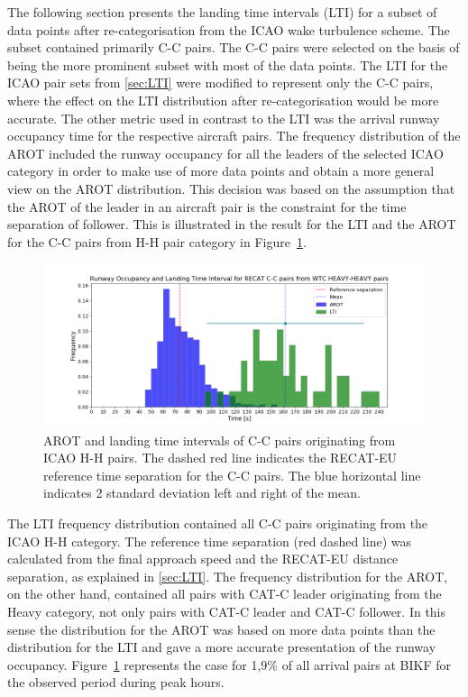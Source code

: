 The following section presents the landing time intervals (LTI) for a subset of data points after re-categorisation from the ICAO wake turbulence scheme. The subset contained primarily C-C pairs. The C-C pairs were selected on the basis of being the more prominent subset with most of the data points. The LTI for the ICAO pair sets from \ref{sec:LTI} were modified to represent only the C-C pairs, where the effect on the LTI distribution after re-categorisation would be more accurate. The other metric used in contrast to the LTI was the arrival runway occupancy time for the respective aircraft pairs. The frequency distribution of the AROT included the runway occupancy for all the leaders of the selected ICAO category in order to make use of more data points and obtain a more general view on the AROT distribution. This decision was based on the assumption that the AROT of the leader in an aircraft pair is the constraint for the time separation of follower. This is illustrated in the result for the LTI and the AROT for the C-C pairs from H-H pair category in Figure~\ref{fig:CC_from_HH_pairs_time_sep}. 

\begin{figure}[h]
    \centering
    \includegraphics[width=1\textwidth]{graphics/fig_CC_from_HH_pairs_time_sep.png}
    \caption[AROT and LTI of C-C pairs originating from ICAO H-H pairs]{AROT and landing time intervals of C-C pairs originating from ICAO H-H pairs. The dashed red line indicates the RECAT-EU reference time separation for the C-C pairs. The blue horizontal line indicates 2 standard deviation left and right of the mean.}
    \label{fig:CC_from_HH_pairs_time_sep}
\end{figure}

The LTI frequency distribution contained all C-C pairs originating from the ICAO H-H category. The reference time separation (red dashed line) was calculated from the final approach speed and the RECAT-EU distance separation, as explained in \ref{sec:LTI}. The frequency distribution for the AROT, on the other hand, contained all pairs with CAT-C leader originating from the Heavy category, not only pairs with CAT-C leader and CAT-C follower. In this sense the distribution for the AROT was based on more data points than the distribution for the LTI and gave a more accurate presentation of the runway occupancy. Figure~\ref{fig:CC_from_HH_pairs_time_sep} represents the case for 1,9\% of all arrival pairs at BIKF for the observed period during peak hours.

